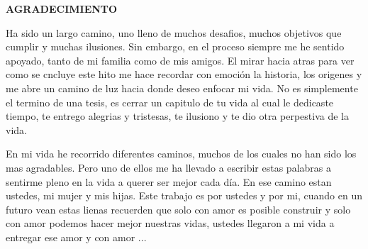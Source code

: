 \begin{center}
\textbf{AGRADECIMIENTO}
\end{center}

Ha sido un largo camino, uno lleno de muchos desafios, muchos objetivos que cumplir y muchas ilusiones. Sin embargo, en el proceso siempre me he sentido apoyado, tanto de mi familia como de mis amigos. El mirar hacia atras para ver como se cncluye este hito me hace recordar con emoción la historia, los origenes y me abre un camino de luz hacia donde deseo enfocar mi vida. No es simplemente el termino de una tesis, es cerrar un capitulo de tu vida al cual le dedicaste tiempo, te entrego alegrias y tristesas, te ilusiono y te dio otra perpestiva de la vida.

En mi vida he recorrido diferentes caminos, muchos de los cuales no han sido los mas agradables. Pero uno de ellos me ha llevado a escribir estas palabras a sentirme pleno en la vida a querer ser mejor cada día. En ese camino estan ustedes, mi mujer y mis hijas. Este trabajo es por ustedes y por mi, cuando en un futuro vean estas lienas recuerden que solo con amor es posible construir y solo con amor podemos hacer mejor nuestras vidas, ustedes llegaron a mi vida a entregar ese amor y con amor ...